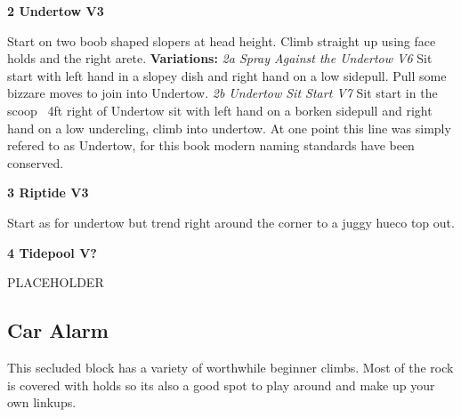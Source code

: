 \begin{multicols}{2}
					\label{rt:Undertow} \colorbox{green!20}{\textbf{2 Undertow V3 \ding{72}    }}
					\begin{adjustwidth}{1cm}{}
					Start on two boob shaped slopers at head height. Climb straight up using face holds and the right arete.
					\newline \textbf{Variations:} \newline
						\label{vr:Spray Against the Undertow} \colorbox{RoyalBlue!20}{\emph{2a Spray Against the Undertow V6  }}
						Sit start with left hand in a slopey dish and right hand on a low sidepull. Pull some bizzare moves to join into Undertow.
						\label{vr:Undertow Sit Start} \colorbox{Goldenrod!50}{\emph{2b Undertow Sit Start V7  \ding{72}   }}
						Sit start in the scoop ~4ft right of Undertow sit with left hand on a borken sidepull and right hand on a low undercling, climb into undertow. At one point this line was simply refered to as Undertow, for this book modern naming standards have been conserved.
					\end{adjustwidth}
					\label{rt:Riptide} \colorbox{green!20}{\textbf{3 Riptide V3    }}
					\begin{adjustwidth}{1cm}{}
					Start as for undertow but trend right around the corner to a juggy hueco top out.
					\end{adjustwidth}
					\label{rt:Tidepool} \colorbox{black!20}{\textbf{4 Tidepool V?  }}
					\begin{adjustwidth}{1cm}{}
					PLACEHOLDER
					\end{adjustwidth}
			\subsection*{Car Alarm}\label{bf:Car Alarm}
			This secluded block has a variety of worthwhile beginner climbs. Most of the rock is covered with holds so its also a good spot to play around and make up your own linkups.
			


\end{multicols}
